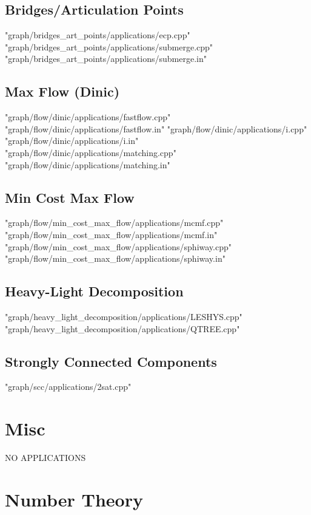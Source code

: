 \documentclass [12pt,onecolumn,oneside]{article}
\begin{document}
\subsection{ Bridges/Articulation Points}
 {"graph/bridges_art_points/applications/ecp.cpp"}
 {"graph/bridges_art_points/applications/submerge.cpp"}
 {"graph/bridges_art_points/applications/submerge.in"}
\subsection{ Max Flow (Dinic)}
 {"graph/flow/dinic/applications/fastflow.cpp"}
 {"graph/flow/dinic/applications/fastflow.in"}
 {"graph/flow/dinic/applications/i.cpp"}
 {"graph/flow/dinic/applications/i.in"}
 {"graph/flow/dinic/applications/matching.cpp"}
 {"graph/flow/dinic/applications/matching.in"}
\subsection{ Min Cost Max Flow}
 {"graph/flow/min_cost_max_flow/applications/mcmf.cpp"}
 {"graph/flow/min_cost_max_flow/applications/mcmf.in"}
 {"graph/flow/min_cost_max_flow/applications/sphiway.cpp"}
 {"graph/flow/min_cost_max_flow/applications/sphiway.in"}
\subsection{ Heavy-Light Decomposition}
 {"graph/heavy_light_decomposition/applications/LESHYS.cpp"}
 {"graph/heavy_light_decomposition/applications/QTREE.cpp"}
\subsection{ Strongly Connected Components}
 {"graph/scc/applications/2sat.cpp"}
\newpage

\section{Misc}
NO APPLICATIONS
\newpage

\section{Number Theory}
\end{document}
